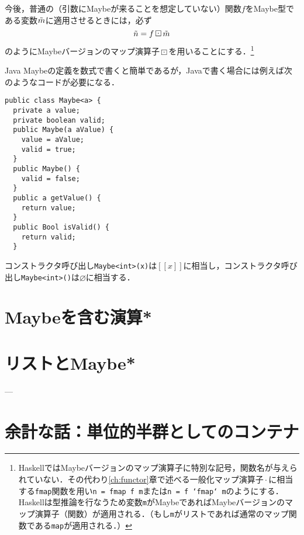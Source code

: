 \documentclass[twocolumn]{jsbook}
\def\[{[\![}
\def\]{]\!]}
\newcommand{\code}[1]{\texttt{#1}}
\newenvironment{javacode}{\begin{itembox}[r]{Java}}{\end{itembox}}
\DeclareMathOperator{\hsklFmap}{\cdot}
\DeclareMathOperator{\hsklMaybeMap}{\boxdot}
\newcommand{\hsklNothing}{\varnothing}
\newcommand{\hsklJust}[1]{\[#1\]}
\newcommand{\hsklMaybe}[1]{\Tilde{#1}}
\begin{document}
今後，普通の（引数にMaybeが来ることを想定していない）関数$f$をMaybe型である変数$\hsklMaybe{m}$に適用させるときには，必ず$$\hsklMaybe{n}=f\hsklMaybeMap\hsklMaybe{m}$$のようにMaybeバージョンのマップ演算子$\hsklMaybeMap$を用いることにする．\footnote{HaskellではMaybeバージョンのマップ演算子に特別な記号，関数名が与えられていない．その代わり\ref{ch:functor}章で述べる一般化マップ演算子$\hsklFmap$に相当する\code{fmap}関数を用い\code{n = fmap f m}または\code{n = f `fmap` m}のようにする．Haskellは型推論を行なうため変数\code{m}がMaybeであればMaybeバージョンのマップ演算子（関数）が適用される．（もし\code{m}がリストであれば通常のマップ関数である\code{map}が適用される．）}



\begin{javacode}
Maybeの定義を数式で書くと簡単であるが，Javaで書く場合には例えば次のようなコードが必要になる．
\begin{Verbatim}
public class Maybe<a> {
  private a value;
  private boolean valid;
  public Maybe(a aValue) {
    value = aValue;
    valid = true;
  }
  public Maybe() {
    valid = false;
  }
  public a getValue() {
    return value;
  }
  public Bool isValid() {
    return valid;
  }
\end{Verbatim}
コンストラクタ呼び出し\code{Maybe<int>(x)}は$\hsklJust{x}$に相当し，コンストラクタ呼び出し\code{Maybe<int>()}は$\hsklNothing$に相当する．
\end{javacode}


\section{Maybeを含む演算*}

\section{リストとMaybe*}

---


\section*{余計な話：単位的半群としてのコンテナ}
\end{document}
